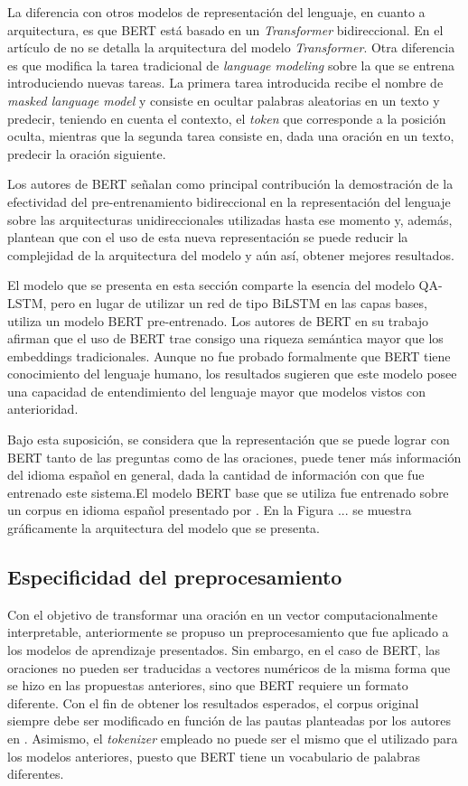 La diferencia con otros modelos de representación del lenguaje, en cuanto a arquitectura, es que BERT está basado en un \textit{Transformer} bidireccional. En el artículo de \cite{2018-devlin-bert} no se detalla la arquitectura del modelo \textit{Transformer}. Otra diferencia es que modifica la tarea tradicional de \textit{language modeling} sobre la que se entrena introduciendo nuevas tareas. La primera tarea introducida recibe el nombre de \textit{masked language model} y consiste en ocultar palabras aleatorias en un texto y predecir, teniendo en cuenta el contexto, el \textit{token} que corresponde a la posición oculta, mientras que la segunda tarea consiste en, dada una oración en un texto, predecir la oración siguiente.

Los autores de BERT señalan como principal contribución la demostración de la efectividad del pre-entrenamiento bidireccional en la representación del lenguaje sobre las arquitecturas unidireccionales utilizadas hasta ese momento y, además, plantean que con el uso de esta nueva representación se puede reducir la complejidad de la arquitectura del modelo y aún así, obtener mejores resultados.

El modelo que se presenta en esta sección comparte la esencia del modelo QA-LSTM, pero en lugar de utilizar un red de tipo BiLSTM en las capas bases, utiliza un modelo BERT pre-entrenado. Los autores de BERT en su trabajo \cite{2018-devlin-bert} afirman que el uso de BERT trae consigo una riqueza semántica mayor que los embeddings tradicionales. Aunque no fue probado formalmente que BERT tiene conocimiento del lenguaje humano, los resultados sugieren que este modelo posee una capacidad de entendimiento del lenguaje mayor que modelos vistos con anterioridad.

Bajo esta suposición, se considera que la representación que se puede lograr con BERT tanto de las preguntas como de las oraciones, puede tener más información del idioma español en general, dada la cantidad de información con que fue entrenado este sistema.El modelo BERT base que se utiliza fue entrenado sobre un corpus en idioma español presentado por \cite{2020-spanish-bert}. En la Figura ... se muestra gráficamente la arquitectura del modelo que se presenta.

\subsection{Especificidad del preprocesamiento}

Con el objetivo de transformar una oración en un vector computacionalmente interpretable, anteriormente se propuso un preprocesamiento que fue aplicado a los modelos de aprendizaje presentados. Sin embargo, en el caso de BERT, las oraciones no pueden ser traducidas a vectores numéricos de la misma forma que se hizo en las propuestas anteriores, sino que BERT requiere un formato diferente. Con el fin de obtener los resultados esperados, el corpus original siempre debe ser modificado en función de las pautas planteadas por los autores en \cite{2018-devlin-bert}. Asimismo, el \textit{tokenizer} empleado no puede ser el mismo que el utilizado para los modelos anteriores, puesto que BERT tiene un vocabulario de palabras diferentes.

